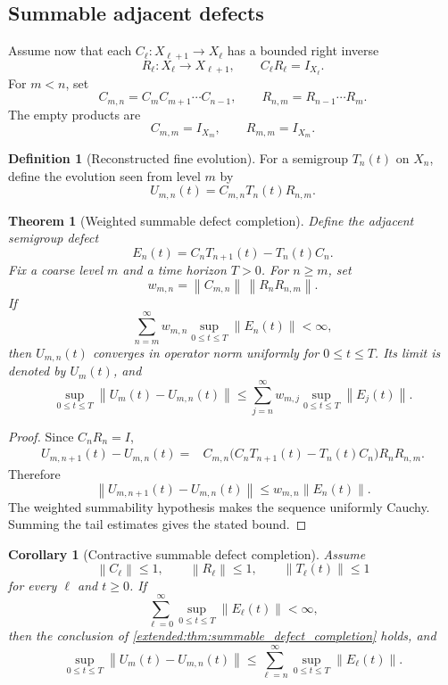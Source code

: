 \documentclass[11pt,letterpaper]{article}
\newtheorem{theorem}{Theorem}[section]
\theoremstyle{plain}
\theoremstyle{plain}
\theoremstyle{plain}
\newtheorem{corollary}[corollary]{Corollary}
\theoremstyle{definition}
\theoremstyle{definition}
\newtheorem{definition}[definition]{Definition}
\theoremstyle{definition}
\theoremstyle{definition}
\theoremstyle{definition}
\theoremstyle{remark}
\theoremstyle{remark}
\theoremstyle{remark}
\theoremstyle{remark}
\theoremstyle{remark}
\newcommand{\norm}[1]{\left\lVert#1\right\rVert}
\theoremstyle{remark}
\begin{document}
\subsection{Summable adjacent defects}

Assume now that each \(C_\ell:X_{\ell+1}\to X_\ell\) has a bounded right inverse
\[
R_\ell:X_\ell\to X_{\ell+1},
\qquad
C_\ell R_\ell=I_{X_\ell}.
\]
For \(m<n\), set
\[
C_{m,n}=C_mC_{m+1}\cdots C_{n-1},
\qquad
R_{n,m}=R_{n-1}\cdots R_m.
\]
The empty products are
\[
C_{m,m}=I_{X_m},
\qquad
R_{m,m}=I_{X_m}.
\]

\begin{definition}[Reconstructed fine evolution]\label{extended:record:018}
For a semigroup \(T_n(t)\) on \(X_n\), define the evolution seen from level \(m\) by
\[
U_{m,n}(t)=C_{m,n}T_n(t)R_{n,m}.
\]
\end{definition}

\begin{theorem}[Weighted summable defect completion]\label{extended:record:019}\label{extended:thm:summable_defect_completion}
Define the adjacent semigroup defect
\[
E_n(t)=C_nT_{n+1}(t)-T_n(t)C_n.
\]
Fix a coarse level \(m\) and a time horizon \(T>0\). For \(n\geq m\), set
\[
w_{m,n}
=
\norm{C_{m,n}}\,
\norm{R_nR_{n,m}}.
\]
If
\[
\sum_{n=m}^{\infty}
w_{m,n}
\sup_{0\leq t\leq T}\norm{E_n(t)}<\infty,
\]
then \(U_{m,n}(t)\) converges in operator norm uniformly for \(0\leq t\leq T\). Its limit is denoted by \(U_m(t)\), and
\[
\sup_{0\leq t\leq T}
\norm{U_m(t)-U_{m,n}(t)}
\leq
\sum_{j=n}^{\infty}w_{m,j}
\sup_{0\leq t\leq T}\norm{E_j(t)}.
\]
\end{theorem}

\begin{proof}
Since \(C_nR_n=I\),
\[
\begin{aligned}
U_{m,n+1}(t)-U_{m,n}(t)
={}&
C_{m,n}
\bigl(C_nT_{n+1}(t)-T_n(t)C_n\bigr)
R_nR_{n,m}.
\end{aligned}
\]
Therefore
\[
\norm{U_{m,n+1}(t)-U_{m,n}(t)}
\leq
w_{m,n}\norm{E_n(t)}.
\]
The weighted summability hypothesis makes the sequence uniformly Cauchy. Summing the tail estimates gives the stated bound.
\end{proof}

\begin{corollary}[Contractive summable defect completion]\label{extended:record:020}\label{extended:cor:contractive_defect_completion}
Assume
\[
\norm{C_\ell}\leq1,
\qquad
\norm{R_\ell}\leq1,
\qquad
\norm{T_\ell(t)}\leq1
\]
for every \(\ell\) and \(t\geq0\). If
\[
\sum_{\ell=0}^{\infty}
\sup_{0\leq t\leq T}\norm{E_\ell(t)}<\infty,
\]
then the conclusion of \cref{extended:thm:summable_defect_completion} holds, and
\[
\sup_{0\leq t\leq T}
\norm{U_m(t)-U_{m,n}(t)}
\leq
\sum_{\ell=n}^{\infty}
\sup_{0\leq t\leq T}\norm{E_\ell(t)}.
\]
\end{corollary}
\end{document}
